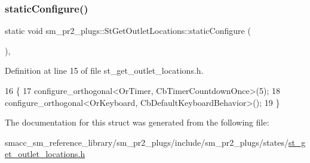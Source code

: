\subsubsection{\texorpdfstring{static\+Configure()}{staticConfigure()}}
{\footnotesize\ttfamily static void sm\+\_\+pr2\+\_\+plugs\+::\+St\+Get\+Outlet\+Locations\+::static\+Configure (\begin{DoxyParamCaption}{ }\end{DoxyParamCaption})\hspace{0.3cm}{\ttfamily [inline]}, {\ttfamily [static]}}



Definition at line 15 of file st\+\_\+get\+\_\+outlet\+\_\+locations.\+h.


\begin{DoxyCode}
16     \{
17         configure\_orthogonal<OrTimer,  CbTimerCountdownOnce>(5);    
18         configure\_orthogonal<OrKeyboard, CbDefaultKeyboardBehavior>();
19     \}
\end{DoxyCode}


The documentation for this struct was generated from the following file\+:\begin{DoxyCompactItemize}
\item 
smacc\+\_\+sm\+\_\+reference\+\_\+library/sm\+\_\+pr2\+\_\+plugs/include/sm\+\_\+pr2\+\_\+plugs/states/\hyperlink{st__get__outlet__locations_8h}{st\+\_\+get\+\_\+outlet\+\_\+locations.\+h}\end{DoxyCompactItemize}
